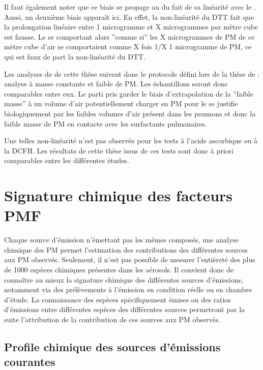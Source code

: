 Il faut également noter que ce biais se propage au \PODTTv{} du fait de sa linéarité avec le
\PODTTm. Aussi, un deuxième biais apparaît ici. En effet, la non-linéarité du DTT fait
que la prolongation linéaire entre 1 microgramme et X microgrammes par mètre cube est
fausse. Le \PODTTv{} se comportant alors ''comme si'' les X microgrammes de PM de ce mètre
cube d'air se comportaient comme X fois 1/X 1 microgramme de PM, ce qui est faux de part
la non-linéarité du DTT.

Les analyses de \PODTT{} de cette thèse suivent donc le protocole défini lors de la thèse
de \textcite{calasPollution2017} : analyse à masse constante et faible de PM. Les
échantillons seront donc comparables entre eux. Le parti pris garder le biais
d'extrapolation de la ''faible masse'' à un volume d'air potentiellement charger en PM
pour le \PODTTv{} se justifie biologiquement par les faibles volumes d'air présent dans les
poumons et donc la faible masse de PM en contacte avec les surfactants pulmonaires.

Une telles non-linéarité n'est pas observée pour les tests à l'acide ascorbique ou à la
DCFH.
Les résultats de cette thèse issus de ces tests sont donc à priori comparables entre les
différentes études.


\section{Signature chimique des facteurs PMF}%
\label{sec:signature_chimique_des_facteurs_PMF}

Chaque source d'émission n'émettant pas les mêmes composés, une analyse chimique
des PM permet l'estimation des contributions des différentes sources aux PM observés.
Seulement, il n'est pas possible de mesurer l'entièreté des plus de 1000 espèces chimiques
présentes dans les aérosols.
Il convient donc de connaître au mieux la signature chimique des différentes sources
d'émissions, notamment via des prélèvements à l'émission en condition
réelle ou en chambre d'étude. La connaissance des espèces spécifiquement émises ou des
ratios d'émissions entre différentes espèces des différentes sources permetront par la
suite l'attribution de la contribution de ces sources aux PM observés.

\subsection{Profile chimique des sources d'émissions courantes}%
\label{sub:profile_chimique_des_sources_d_émissions_courantes}

